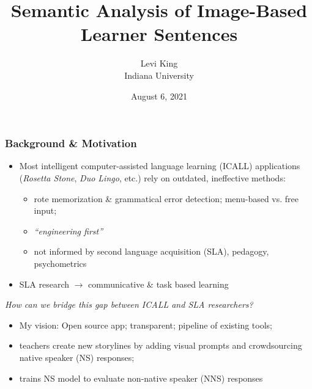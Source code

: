 \documentclass[handout,xcolor={dvipsnames}]{beamer}
\title{Semantic Analysis of Image-Based Learner Sentences}
\author[Levi King]{Levi King\\
Indiana University  }
\date{August 6, 2021}
\begin{document}
\maketitle
\begin{frame}
\frametitle{Background \& Motivation}
\begin{itemize}
\pause
\item Most intelligent computer-assisted language learning (ICALL) applications (\textit{Rosetta Stone}, \textit{Duo Lingo}, etc.) rely on outdated, ineffective methods:
\begin{itemize}
\pause
\item rote memorization \& grammatical error detection; menu-based vs. free input;
\pause
\item \textit{``engineering first''}
\pause
\item not informed by second language acquisition (SLA), pedagogy, psychometrics
\end{itemize}
\pause
\item  SLA research $\rightarrow$ communicative \& task based learning
\end{itemize}

\small
\pause
\textit{How can we bridge this gap between ICALL and SLA researchers?}

\begin{itemize}
\pause
\item My vision: \pause Open source app; transparent; pipeline of existing tools;
\pause
\item teachers create new storylines by adding visual prompts and crowdsourcing native speaker (NS) responses;
\pause
\item trains NS model to evaluate non-native speaker (NNS) responses
\end{itemize}
\end{frame}
\end{document}

